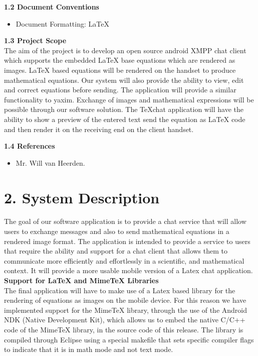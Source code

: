 \documentclass[29pt,a4paper]{moderncv}
\begin{document}
		\noindent \textbf{1.2 Document Conventions}
			\begin{itemize}
				\item Document Formatting: LaTeX
			\end{itemize}
		\vspace{5mm}
		
		\noindent \textbf{1.3 Project Scope}
			\\The aim of the project is to develop an open source android XMPP chat client which supports the embedded LaTeX base equations which are rendered as images. LaTeX based equations will be rendered on the handset to produce mathematical equations. Our system will also provide the ability to view, edit and correct equations before sending.
			\parindent 5mm The application will provide a similar functionality to yaxim. Exchange of images and mathematical expressions will be possible through our software solution. The TeXchat application will have the ability to show a preview of the entered text send the equation as LaTeX code and then render it on the receiving end on the client handset.
		\vspace{5mm}
		
	\noindent \textbf{1.4 References}
		\begin{itemize}
		\item Mr. Will van Heerden.
		\end{itemize}
		\vspace{5mm}
		
\newpage
	\section*{\textbf{2. System Description}}
	\vspace{4mm}
		\noindent The goal of our software application is to provide a chat service that will allow users to exchange messages and also to send mathematical equations in a rendered image format.  The application is intended to provide a service to users that require the ability and support for a chat client that allows them to communicate more efficiently and effortlessly in a scientific, and mathematical context.  It will provide a more usable mobile version of a Latex chat application.\\ 
		
		\noindent\textbf{Support for LaTeX and MimeTeX Libraries}
		\\The final application will have to make use of a Latex based library for the rendering of equations as images on the mobile device. For this reason we have implemented support for the MimeTeX library, through the use of the Android NDK (Native Development Kit), which allows us to embed the native C/C++ code of the MimeTeX library, in the source code of this release. The library is compiled through Eclipse using a special makefile that sets specific compiler flags to indicate that it is in math mode and not text mode.\\
		
\end{document}
